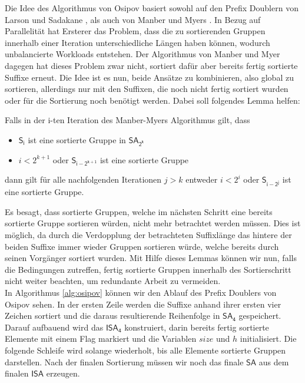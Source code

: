 Die Idee des Algorithmus von Osipov basiert sowohl auf den Prefix Doublern von Larson und Sadakane \cite{saca:1}, als auch von Manber und Myers \cite{Manber1993}. In Bezug auf Parallelität hat Ersterer das Problem, dass die zu sortierenden Gruppen innerhalb einer Iteration unterschiedliche Längen haben können, wodurch unbalancierte Workloads entstehen. Der Algorithmus von Manber und Myer dagegen hat dieses Problem zwar nicht, sortiert dafür aber bereits fertig sortierte Suffixe erneut. Die Idee ist es nun, beide Ansätze zu kombinieren, also global zu sortieren, allerdings nur mit den Suffixen, die noch nicht fertig sortiert wurden oder für die Sortierung noch benötigt werden. Dabei soll folgendes Lemma helfen:
\begin{lemma}\label{lem:sort-gruppe}
Falls in der i-ten Iteration des Manber-Myers Algorithmus gilt, dass
\begin{itemize}
\item $\mathsf{S_i}$ ist eine sortierte Gruppe in $\mathsf{SA_{2^k}}$
\item $i < 2^{k+1}$ oder $\mathsf{S_{i-2^{k+1}}}$ ist eine sortierte Gruppe
\end{itemize} 
dann gilt für alle nachfolgenden Iterationen $j>k$ entweder $i<2^i$ oder $\mathsf{S_{i-2^j}}$ ist eine sortierte Gruppe.
\end{lemma}
Es besagt, dass sortierte Gruppen, welche im nächsten Schritt eine bereits sortierte Gruppe sortieren würden, nicht mehr betrachtet werden müssen. Dies ist möglich, da durch die Verdopplung der betrachteten Suffixlänge das hintere der beiden Suffixe immer wieder Gruppen sortieren würde, welche bereits durch seinen Vorgänger sortiert wurden.
Mit Hilfe dieses Lemmas können wir nun, falls die Bedingungen zutreffen, fertig sortierte Gruppen innerhalb des Sortierschritt nicht weiter beachten, um redundante Arbeit zu vermeiden.\\

In Algorithmus \ref{alg:osipov} können wir den Ablauf des Prefix Doublers von Osipov sehen. In der ersten Zeile werden die Suffixe anhand ihrer ersten vier Zeichen sortiert und die daraus resultierende Reihenfolge in $\mathsf{SA_4}$ gespeichert. Darauf aufbauend wird das $\mathsf{ISA_4}$ konstruiert, darin bereits fertig sortierte Elemente mit einem Flag markiert und die Variablen $size$ und $h$ initialisiert. Die folgende Schleife wird solange wiederholt, bis alle Elemente sortierte Gruppen darstellen. Nach der finalen Sortierung müssen wir noch das finale $\mathsf{SA}$ aus dem finalen $\mathsf{ISA}$ erzeugen.

